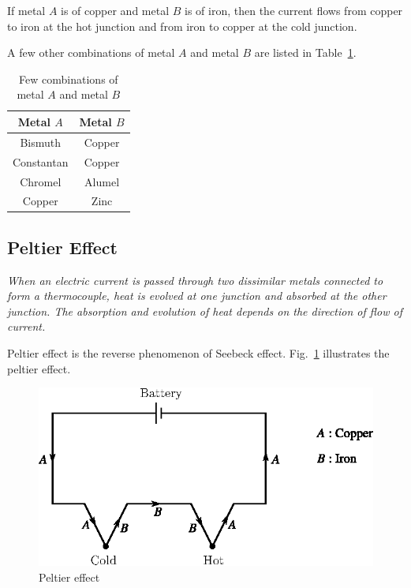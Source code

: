 If metal $A$ is of copper and metal $B$ is of iron, then the current flows from copper to iron at the hot junction and from iron to copper at the cold junction.

A few other combinations of metal $A$ and metal $B$ are listed in Table~\ref{tab8.1}.
\begin{table}[H]
\tabcolsep=6pt
\renewcommand{\arraystretch}{1.1}
\begin{tabular}{|c|c|}
\hline
{\bf Metal \boldmath$A$} & {\bf Metal \boldmath$B$}\\
\hline
Bismuth & Copper\\
Constantan & Copper\\
Chromel & Alumel\\
Copper & Zinc\\
\hline
\end{tabular}
\caption{Few combinations of metal $A$ and metal $B$}\label{tab8.1}
\end{table}

\subsection{Peltier Effect}\label{sec8.13.2}

{\em When an electric current is passed through two dissimilar metals connected to form a thermocouple, heat is evolved at one junction and absorbed at the other junction. The absorption and evolution of heat depends on the direction of flow of current.}

Peltier effect is the reverse phenomenon of Seebeck effect. Fig.~\ref{fig8.21} illustrates the peltier effect.
\begin{figure}[H]
\centering
\includegraphics[scale=.95]{chap8/fig8.21.eps}
\caption{Peltier effect}\label{fig8.21}
\end{figure}

